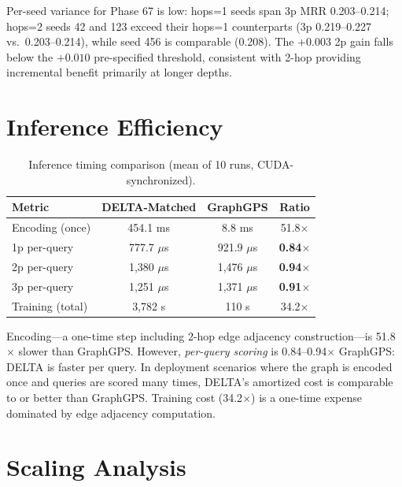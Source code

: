 \documentclass{article}
\begin{document}
Per-seed variance for Phase 67 is low: hops=1 seeds span 3p MRR 0.203--0.214; hops=2 seeds 42 and 123 exceed their hops=1 counterparts (3p 0.219--0.227 vs.\ 0.203--0.214), while seed 456 is comparable (0.208). The $+0.003$ 2p gain falls below the $+0.010$ pre-specified threshold, consistent with 2-hop providing incremental benefit primarily at longer depths.

\section{Inference Efficiency}
\label{app:inference}

\begin{table}[h]
\centering
\caption{Inference timing comparison (mean of 10 runs, CUDA-synchronized).}
\label{tab:timing}
\begin{tabular}{@{}lccc@{}}
\toprule
\textbf{Metric} & \textbf{DELTA-Matched} & \textbf{GraphGPS} & \textbf{Ratio} \\
\midrule
Encoding (once) & 454.1 ms & 8.8 ms & 51.8$\times$ \\
1p per-query & 777.7 $\mu$s & 921.9 $\mu$s & \textbf{0.84$\times$} \\
2p per-query & 1,380 $\mu$s & 1,476 $\mu$s & \textbf{0.94$\times$} \\
3p per-query & 1,251 $\mu$s & 1,371 $\mu$s & \textbf{0.91$\times$} \\
Training (total) & 3,782 s & 110 s & 34.2$\times$ \\
\bottomrule
\end{tabular}
\end{table}

Encoding---a one-time step including 2-hop edge adjacency construction---is 51.8$\times$ slower than GraphGPS. However, \emph{per-query scoring} is 0.84--0.94$\times$ GraphGPS: DELTA is faster per query. In deployment scenarios where the graph is encoded once and queries are scored many times, DELTA's amortized cost is comparable to or better than GraphGPS. Training cost (34.2$\times$) is a one-time expense dominated by edge adjacency computation.

\section{Scaling Analysis}
\label{app:scaling}
\end{document}
